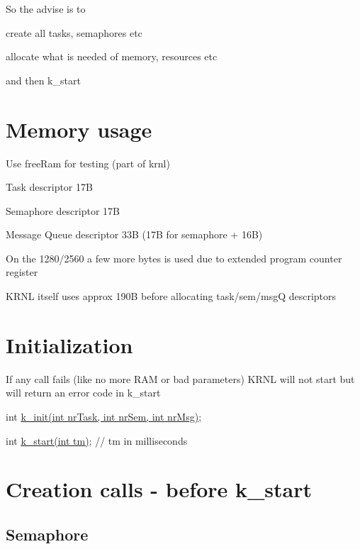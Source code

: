So the advise is to


\begin{DoxyItemize}
\item create all tasks, semaphores etc
\item allocate what is needed of memory, resources etc
\item and then k\+\_\+start
\end{DoxyItemize}\hypertarget{index_a112}{}\section{Memory usage}\label{index_a112}
Use free\+Ram for testing (part of krnl)


\begin{DoxyItemize}
\item Task descriptor 17\+B
\item Semaphore descriptor 17\+B
\item Message Queue descriptor 33\+B (17\+B for semaphore + 16\+B)
\end{DoxyItemize}

On the 1280/2560 a few more bytes is used due to extended program counter register

K\+R\+N\+L itself uses approx 190\+B before allocating task/sem/msg\+Q descriptors\hypertarget{index_a3}{}\section{Initialization}\label{index_a3}
If any call fails (like no more R\+A\+M or bad parameters) K\+R\+N\+L will not start but will return an error code in k\+\_\+start
\begin{DoxyItemize}
\item int \hyperlink{krnl_8h_ad939ea35387a46c6c94a096d41c0d18b}{k\+\_\+init(int nr\+Task, int nr\+Sem, int nr\+Msg)};
\item int \hyperlink{krnl_8h_abed191616e4e3d1fa684f9ca719715fb}{k\+\_\+start(int tm)}; // tm in milliseconds
\end{DoxyItemize}\hypertarget{index_a4}{}\section{Creation calls -\/ before k\+\_\+start}\label{index_a4}
\hypertarget{index_a41}{}\subsection{Semaphore}\label{index_a41}

